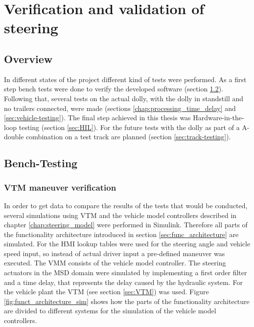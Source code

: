 \documentclass[ExampleMasters.tex]{subfiles}
\begin{document}
\clearpage
{\pagestyle{empty}\cleardoublepage}%
\chapter{Verification and validation of steering}
\label{chap:testing}

\section{Overview}
In different states of the project different kind of tests were performed. As a first step bench tests were done to verify the developed software (section \ref{sec:bench-testing}). Following that, several tests on the actual dolly, with the dolly in standstill and no trailers connected, were made (sections \ref{chap:processing_time_delay} and \ref{sec:vehicle-testing}). The final step achieved in this thesis was Hardware-in-the-loop testing (section \ref{sec:HIL}).
For the future tests with the dolly as part of a A-double combination on a test track are planned (section \ref{sec:track-testing}).

\section{Bench-Testing}
\label{sec:bench-testing}
\subsection{VTM maneuver verification}

In order to get data to compare the results of the tests that would be conducted, several simulations using \gls{VTM} and the vehicle model controllers described in chapter \ref{chap:steering_model} were performed in Simulink. Therefore all parts of the functionality architecture introduced in section \ref{sec:func_architecture} are simulated.
For the \gls{HMI} lookup tables were used for the steering angle and vehicle speed input, so instead of actual driver input a pre-defined maneuver was executed. The \gls{VMM} consists of the vehicle model controller. The steering actuators in the \gls{MSD} domain were simulated by implementing a first order filter and a time delay, that represents the delay caused by the hydraulic system. For the vehicle plant the \gls{VTM} (see section \ref{sec:VTM}) was used. Figure \ref{fig:funct_architecture_sim} shows how the parts of the functionality architecture are divided to different systems for the simulation of the vehicle model controllers.
\end{document}
